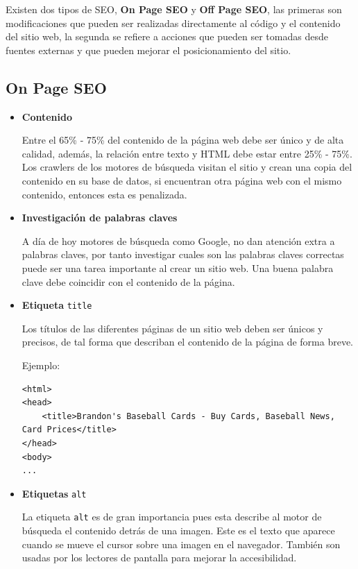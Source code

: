 \documentclass[12pt]{article}
\begin{document}
Existen dos tipos de SEO, \textbf{On Page SEO} y \textbf{Off Page SEO}, las primeras son modificaciones que pueden ser realizadas directamente al código y el contenido del sitio web, la segunda se refiere a acciones que pueden ser tomadas desde fuentes externas y que pueden mejorar el posicionamiento del sitio.

\subsection{On Page SEO}

\begin{itemize}
\item \textbf{Contenido}

Entre el 65\% - 75\% del contenido de la página web debe ser único y de alta calidad, además, la relación entre texto y HTML debe estar entre 25\% - 75\%. Los crawlers de los motores de búsqueda visitan el sitio y crean una copia del contenido en su base de datos, si encuentran otra página web con el mismo contenido, entonces esta es penalizada.

\item \textbf{Investigación de palabras claves}

A día de hoy motores de búsqueda como Google, no dan atención extra a palabras claves, por tanto investigar cuales son las palabras claves correctas puede ser una tarea importante al crear un sitio web. Una buena palabra clave debe coincidir con el contenido de la página.

\item \textbf{Etiqueta} \verb+title+

Los títulos de las diferentes páginas de un sitio web deben ser únicos y precisos, de tal forma que describan el contenido de la página de forma breve.

Ejemplo:
\begin{lstlisting}
<html>
<head>
    <title>Brandon's Baseball Cards - Buy Cards, Baseball News, Card Prices</title>
</head>
<body>
...
\end{lstlisting}

\item \textbf{Etiquetas} \verb+alt+

La etiqueta \verb+alt+ es de gran importancia pues esta describe al motor de búsqueda el contenido detrás de una imagen. Este es el texto que aparece cuando se mueve el cursor sobre una imagen en el navegador. También son usadas por los lectores de pantalla para mejorar la accesibilidad.


\end{itemize}
\end{document}
